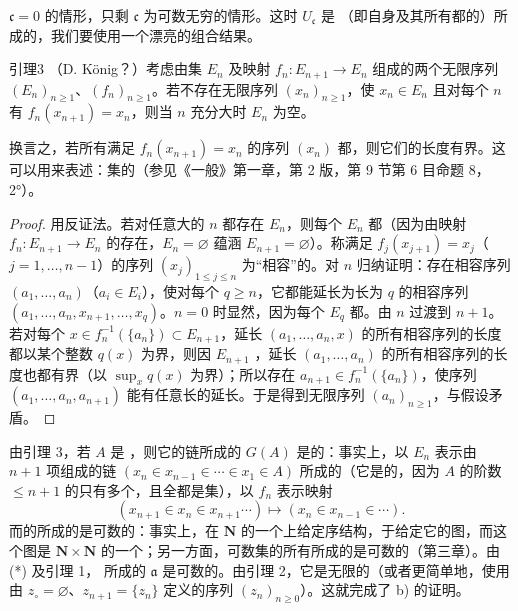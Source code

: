 $\mathfrak{c}=0$ 的情形，只剩 $\mathfrak{c}$ 为可数无穷的情形。这时 $U_{\mathfrak{c}}$ 是 （即自身及其所有都的）所成的，我们要使用一个漂亮的组合结果。
\begin{SGAresult}{引理}{3}
（D. König？）考虑由集 $E_n$ 及映射 $f_n:E_{n+1}\to E_n$ 组成的两个无限序列 $(E_n)_{n\geq1}$、$(f_n)_{n\geq1}$。若不存在无限序列 $(x_n)_{n\geq1}$，使 $x_n\in E_n$ 且对每个 $n$ 有 $f_n(x_{n+1})=x_n$，则当 $n$ 充分大时 $E_n$ 为空。
\end{SGAresult}
换言之，若所有满足 $f_n(x_{n+1})=x_n$ 的序列 $(x_n)$ 都，则它们的长度有界。这可以用来表述：集的（参见《一般》第一章，第 2 版，第 9 节第 6 目命题 8，2°）。
\begin{proof}
用反证法。若对任意大的 $n$ 都存在 $E_n$，则每个 $E_n$ 都（因为由映射 $f_n:E_{n+1}\to E_n$ 的存在，$E_n=\varnothing$ 蕴涵 $E_{n+1}=\varnothing$）。称满足 $f_j(x_{j+1})=x_j$（$j=1,\ldots,n-1$）的序列 $(x_j)_{1\leq j\leq n}$ 为“相容”的。对 $n$ 归纳证明：存在相容序列 $(a_1,\ldots,a_n)$（$a_i\in E_i$），使对每个 $q\geq n$，它都能延长为长为 $q$ 的相容序列 $(a_1,\ldots,a_n,x_{n+1},\ldots,x_q)$。$n=0$ 时显然，因为每个 $E_q$ 都。由 $n$ 过渡到 $n+1$。若对每个 $x\in f_n^{-1}(\{a_n\})\subset E_{n+1}$，延长 $(a_1,\ldots,a_n,x)$ 的所有相容序列的长度都以某个整数 $q(x)$ 为界，则因 $E_{n+1}$ ，延长 $(a_1,\ldots,a_n)$ 的所有相容序列的长度也都有界（以 $\sup_xq(x)$ 为界）；所以存在 $a_{n+1}\in f_n^{-1}(\{a_n\})$，使序列 $(a_1,\ldots,a_n,a_{n+1})$ 能有任意长的延长。于是得到无限序列 $(a_n)_{n\geq1}$，与假设矛盾。
\end{proof}
由引理 3，若 $A$ 是 ，则它的链所成的 $G(A)$ 是的：事实上，以 $E_n$ 表示由
$n+1$ 项组成的链 $(x_n\in x_{n-1}\in\cdots\in x_1\in A)$ 所成的（它是的，因为 $A$ 的阶数 $\leq n+1$ 的只有多个，且全都是集），以 $f_n$ 表示映射
\[
 (x_{n+1}\in x_n\in x_{n+1}\cdots)\longmapsto(x_n\in x_{n-1}\in\cdots).
\]
而的所成的是可数的：事实上，在 $\mathbf N$ 的一个上给定序结构，于给定它的图，而这个图是 $\mathbf N\times\mathbf N$ 的一个；另一方面，可数集的所有所成的是可数的（第三章）。由 (*) 及引理 1， 所成的 $\mathfrak a$ 是可数的。由引理 2，它是无限的（或者更简单地，使用由 $z_\circ=\varnothing$、$z_{n+1}=\{z_n\}$ 定义的序列 $(z_n)_{n\geq0}$）。这就完成了 b) 的证明。

